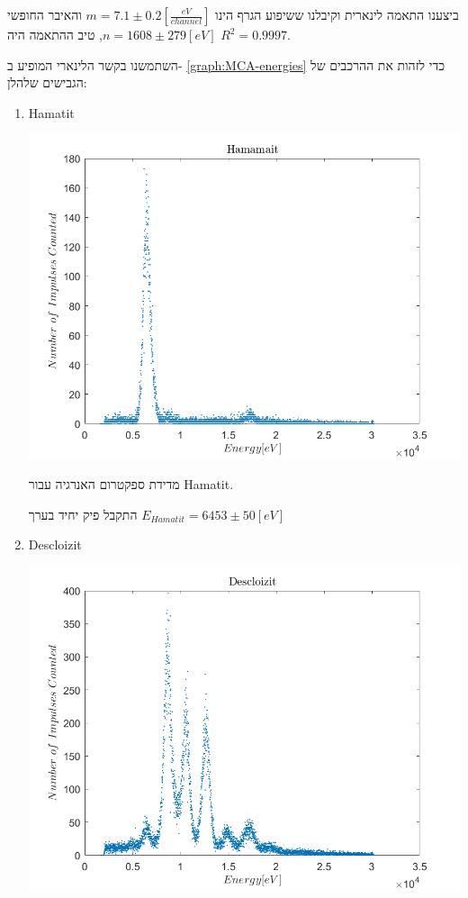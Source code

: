 \documentclass{article}
\begin{document}
ביצענו התאמה לינארית וקיבלנו ששיפוע הגרף הינו 
$m = 7.1 \pm 0.2 [\frac{eV}{channel}]$
והאיבר החופשי 
$n = 1608 \pm 279 [eV]$,
טיב ההתאמה היה 
$R^2 = 0.9997$.

השתמשנו בקשר הלינארי המופיע ב-
\ref{graph:MCA-energies}
כדי לזהות את ההרכבים של הגבישים שלהלן:
\begin{enumerate}
    \item Hamatit
    \begin{graph}[H]
    \centering
    \includegraphics[width=\textwidth]{Hamamit.png}
    \caption{מדידת ספקטרום האנרגיה עבור 
    \textenglish{Hamatit}.
    }
    \label{graph:Hamatit-spec}
    \end{graph}
    התקבל פיק יחיד בערך
    $E_{Hamatit} = 6453 \pm 50 [eV]$
    \item Descloizit
    \begin{graph}[H]
    \centering
    \includegraphics[width=\textwidth]{Descloizit.png}

\end{graph}
\end{enumerate}
\end{document}
